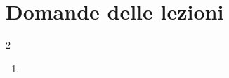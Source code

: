 \appendix
\chapter{Domande delle lezioni}
\begin{multicols}{2}
\begin{enumerate}
    \item 
\end{enumerate}
\end{multicols}